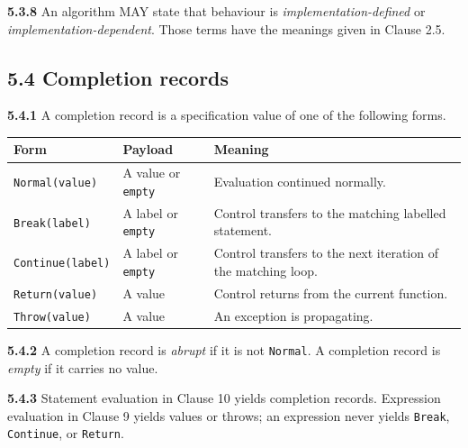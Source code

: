 \documentclass[
  english,
  11pt,
  a4paper,
]{article}
\begin{document}
\textbf{5.3.8} An algorithm MAY state that behaviour is
\emph{implementation-defined} or \emph{implementation-dependent}. Those
terms have the meanings given in Clause 2.5.

\subsection{5.4 Completion records}\label{completion-records}

\textbf{5.4.1} A completion record is a specification value of one of
the following forms.

\begin{longtable}[]{@{}
  >{\raggedright\arraybackslash}p{}
  >{\raggedright\arraybackslash}p{}
  >{\raggedright\arraybackslash}p{}@{}}
\toprule\noalign{}
\begin{minipage}[b]{\linewidth}\raggedright
Form
\end{minipage} & \begin{minipage}[b]{\linewidth}\raggedright
Payload
\end{minipage} & \begin{minipage}[b]{\linewidth}\raggedright
Meaning
\end{minipage} \\
\midrule\noalign{}
\endhead
\bottomrule\noalign{}
\endlastfoot
\texttt{Normal(value)} & A value or \texttt{empty} & Evaluation
continued normally. \\
\texttt{Break(label)} & A label or \texttt{empty} & Control transfers to
the matching labelled statement. \\
\texttt{Continue(label)} & A label or \texttt{empty} & Control transfers
to the next iteration of the matching loop. \\
\texttt{Return(value)} & A value & Control returns from the current
function. \\
\texttt{Throw(value)} & A value & An exception is propagating. \\
\end{longtable}

\textbf{5.4.2} A completion record is \emph{abrupt} if it is not
\texttt{Normal}. A completion record is \emph{empty} if it carries no
value.

\textbf{5.4.3} Statement evaluation in Clause 10 yields completion
records. Expression evaluation in Clause 9 yields values or throws; an
expression never yields \texttt{Break}, \texttt{Continue}, or
\texttt{Return}.
\end{document}

